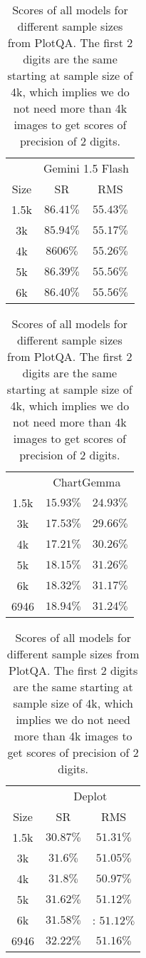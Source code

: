 \begin{table}
 \begin{tabular}{|c|c|c|}
     & \multicolumn{2}{|c|}{Gemini 1.5 Flash} \\
     Size  & SR & RMS \\
     1.5k & $86.41\%$ & $55.43\%$ \\
     3k & $85.94\%$ &  $55.17\%$  \\
     4k & $8606\%$ & $55.26\%$  \\
     5k & $86.39\%$ & $55.56\%$ \\
     6k & $86.40\%$ & $55.56\%$ \\
 \end{tabular}
    \begin{tabular}{|c|c|c|}
        & \multicolumn{2}{|c|}{ChartGemma} \\
        1.5k & $15.93\%$ &  $24.93\%$ \\
        3k & $17.53\%$ &  $29.66\%$ \\
        4k & $17.21\%$ &   $30.26\%$ \\
        5k & $18.15\%$ &  $31.26\%$ \\
        6k & $18.32\%$ & $31.17\%$ \\
        6946 & $18.94\%$ &  $31.24\%$ \\
    \end{tabular}
    \begin{tabular}{|c|c|c|}
        & \multicolumn{2}{|c|}{Deplot} \\
     Size  & SR & RMS \\
        1.5k & $30.87\%$ &  $51.31\%$ \\
        3k & $31.6\%$ &  $51.05\%$ \\
        4k & $31.8\%$ & $50.97\%$ \\
        5k & $31.62\%$ & $51.12\%$ \\
        6k & $31.58\%$ & : $51.12\%$ \\
        6946 &$32.22\%$ & $51.16\%$ \\
    \end{tabular}
 \caption{Scores of all models for different sample sizes from PlotQA.
    The first 2 digits are the same starting at sample size of 4k, which implies we do not need more than 4k images to get scores of precision of 2 digits.}
 \label{tab:plotqa-scores-for-various-sizes}
  \end{table}
